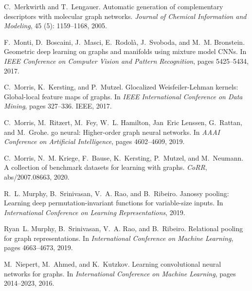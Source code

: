 \documentclass{article}
\theoremstyle{definition}
\begin{document}
\begin{thebibliography}{125}
	C.~Merkwirth and T.~Lengauer.
	\newblock Automatic generation of complementary descriptors with molecular
	graph networks.
	\newblock \emph{Journal of Chemical Information and Modeling}, 45
	(5): 1159--1168, 2005.
	
	F.~Monti, D.~Boscaini, J.~Masci, E.~Rodol{\`{a}}, J.~Svoboda, and M.~M.
	Bronstein.
	\newblock Geometric deep learning on graphs and manifolds using mixture model
	{CNNs}.
	\newblock In \emph{IEEE Conference on Computer Vision and Pattern Recognition},
	pages 5425--5434, 2017.
	
	C.~Morris, K.~Kersting, and P.~Mutzel.
	\newblock Glocalized {W}eisfeiler-{L}ehman kernels: Global-local feature maps
	of graphs.
	\newblock In \emph{IEEE International Conference on Data Mining}, pages
	327--336. IEEE, 2017.
	
	C.~Morris, M.~Ritzert, M.~Fey, W.~L. Hamilton, Jan~Eric Lenssen, G.~Rattan, and
	M.~Grohe.
	 go neural: {H}igher-order graph neural
	networks.
	\newblock In \emph{AAAI Conference on Artificial Intelligence}, pages
	4602--4609, 2019.
	
	C.~Morris, N.~M. Kriege, F.~Bause, K.~Kersting, P.~Mutzel, and M.~Neumann.
	 {A} collection of benchmark datasets for learning with
	graphs.
	\newblock \emph{CoRR}, abs/2007.08663, 2020.
	
	R.~L. Murphy, B.~Srinivasan, V.~A. Rao, and B.~Ribeiro.
	\newblock Janossy pooling: Learning deep permutation-invariant functions for
	variable-size inputs.
	\newblock In \emph{International Conference on Learning Representations},
	2019{}.
	
	Ryan~L. Murphy, B.~Srinivasan, V.~A. Rao, and B.~Ribeiro.
	\newblock Relational pooling for graph representations.
	\newblock In \emph{International Conference on Machine Learning}, pages
	4663--4673, 2019{}.
	
	M.~Niepert, M.~Ahmed, and K.~Kutzkov.
	\newblock Learning convolutional neural networks for graphs.
	\newblock In \emph{International Conference on Machine Learning}, pages
	2014--2023, 2016.
	

\end{thebibliography}
\end{document}
